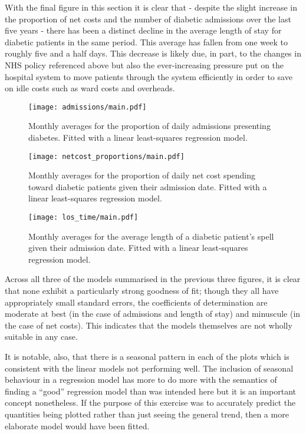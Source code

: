 With the final figure in this section it is clear that \-- despite the slight
increase in the proportion of net costs and the number of diabetic admissions
over the last five years \-- there has been a distinct decline in the average
length of stay for diabetic patients in the same period. This average has fallen
from one week to roughly five and a half days. This decrease is likely due, in
part, to the changes in NHS policy referenced above but also the ever-increasing
pressure put on the hospital system to move patients through the system
efficiently in order to save on idle costs such as ward costs and overheads.


\begin{figure}[htbp]
    \centering
    \texttt{[image: admissions/main.pdf]}
    \caption{Monthly averages for the proportion of daily admissions presenting
        diabetes. Fitted with a linear least-squares regression model.}%
    \label{fig:admissions}
\end{figure}

\begin{figure}[htbp]
    \centering
    \texttt{[image: netcost\_proportions/main.pdf]}
    \caption{Monthly averages for the proportion of daily net cost spending
        toward diabetic patients given their admission date. Fitted with a
        linear least-squares regression model.}%
    \label{fig:netcost_proportions}
\end{figure}

\begin{figure}[htbp]
    \centering
    \texttt{[image: los\_time/main.pdf]}
    \caption{Monthly averages for the average length of a diabetic patient's
        spell given their admission date. Fitted with a linear least-squares
        regression model.}%
    \label{fig:los_time}
\end{figure}

Across all three of the models summarised in the previous three figures, it is
clear that none exhibit a particularly strong goodness of fit; though they all
have appropriately small standard errors, the coefficients of determination are
moderate at best (in the case of admissions and length of stay) and minuscule
(in the case of net costs). This indicates that the models themselves are not
wholly suitable in any case.

It is notable, also, that there is a seasonal pattern in each of the plots which
is consistent with the linear models not performing well. The inclusion of
seasonal behaviour in a regression model has more to do more with the semantics
of finding a ``good'' regression model than was intended here but it is an
important concept nonetheless. If the purpose of this exercise was to accurately
predict the quantities being plotted rather than just seeing the general trend,
then a more elaborate model would have been fitted.
